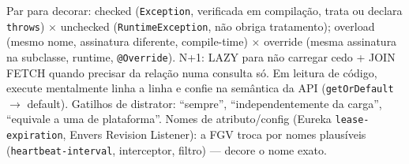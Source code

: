 \begin{comosair}
Par para decorar: checked (\texttt{Exception}, verificada em compilação,
trata ou declara \texttt{throws}) $\times$ unchecked (\texttt{RuntimeException},
não obriga tratamento); overload (mesmo nome, assinatura diferente,
compile-time) $\times$ override (mesma assinatura na subclasse, runtime,
\texttt{@Override}). N+1: LAZY para não carregar cedo + JOIN FETCH quando
precisar da relação numa consulta só. Em leitura de código, execute
mentalmente linha a linha e confie na semântica da API (\texttt{getOrDefault}
$\to$ default). Gatilhos de distrator: ``sempre'', ``independentemente da
carga'', ``equivale a uma de plataforma''. Nomes de atributo/config (Eureka
\texttt{lease-expiration}, Envers Revision Listener): a FGV troca por nomes
plausíveis (\texttt{heartbeat-interval}, interceptor, filtro) --- decore o
nome exato.
\end{comosair}
